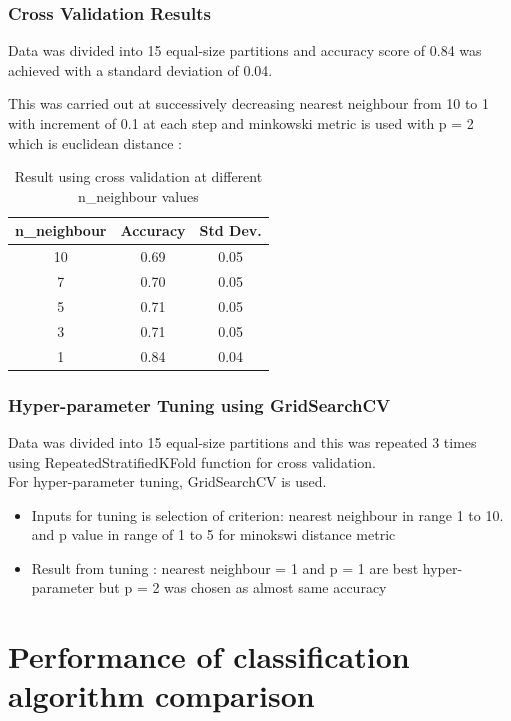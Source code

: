\documentclass[12pt, letter]{article}
\begin{document}
\subsubsection{Cross Validation Results}

Data was divided into 15 equal-size partitions and accuracy score of 0.84 was achieved with a standard deviation of 0.04. 

This was carried out at successively decreasing nearest neighbour from 10 to 1 with increment of 0.1 at each step and minkowski metric is used with p = 2 which is euclidean distance : \\

\begin{table}[h]
\centering
\caption{Result using cross validation at different n\_neighbour values}
\label{tab:my_label}
\begin{tabular}{c|c|c}
\hline
n\_neighbour & Accuracy & Std Dev. \\
\hline
\midrule
10 & 0.69 & 0.05 \\
7 & 0.70 & 0.05 \\
5 & 0.71 & 0.05 \\
3 & 0.71 & 0.05 \\
1 & 0.84 & 0.04 \\ 
\hline    
\end{tabular}
\end{table}

\subsubsection{Hyper-parameter Tuning using GridSearchCV}
Data was divided into 15 equal-size partitions and this was repeated 3 times using RepeatedStratifiedKFold function for cross validation. \\

For hyper-parameter tuning, GridSearchCV is used. \\
\begin{itemize}
    \item Inputs for tuning is selection of criterion: nearest neighbour in range 1 to 10. and p value in range of 1 to 5 for minokswi distance metric  
    \item Result from tuning : nearest neighbour = 1 and p = 1 are best hyper-parameter but p = 2 was chosen as almost same accuracy 
\end{itemize}

\pagebreak
\section{Performance of classification algorithm comparison}
\end{document}
